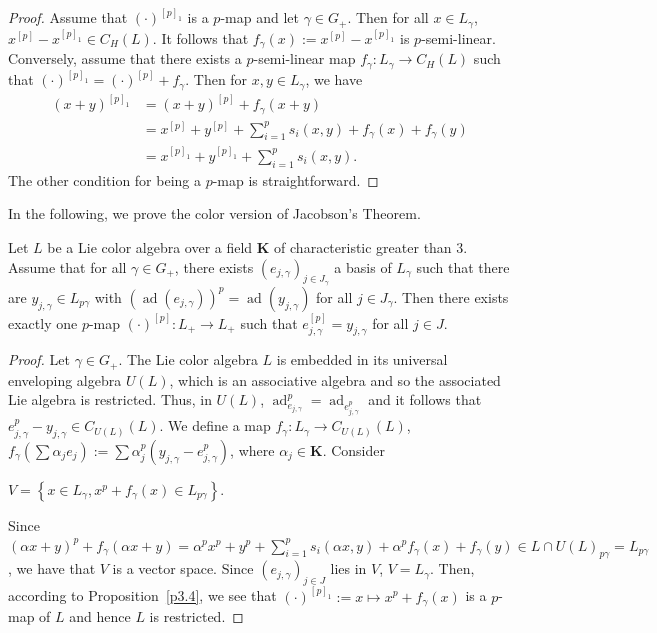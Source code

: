 \documentclass[11pt, twoside]{article}
\DeclareMathOperator{\ad}{ad}
\begin{document}
\begin{proof}
     Assume that $(\cdot)^{[p]_1} $ is a $p$-map and  let $\gamma\in G_+$. Then for all $x\in L_\gamma$, $x^{[p]}-x^{[p]_1}\in C_H(L) $. It follows that $f_\gamma(x):= x^{[p]}-x^{[p]_1} $ is $p$-semi-linear. Conversely, assume that there exists a $p$-semi-linear map $f_\gamma: L_\gamma\to C_H(L)$ such that $(\cdot)^{[p]_1}= (\cdot)^{[p]}+ f_\gamma $. Then for $x,y\in L_\gamma $, we have \begin{align*}
        (x+y)^{[p]_1} &= (x+y)^{[p]}+ f_\gamma(x+y) \\ &= x^{[p]}+y^{[p]} + \sum\limits_{i=1}^p s_i(x,y) + f_\gamma(x) +f_\gamma(y) \\ & = x^{[p]_1}+y^{[p]_1} + \sum\limits_{i=1}^ps_i(x,y). 
    \end{align*} The other condition for being a $p$-map is straightforward. 
\end{proof}
In the following, we prove the color version of Jacobson's Theorem.
\begin{thm}\label{thm3.5}
    Let $L$ be a Lie color algebra over a field $\mathbf{K} $ of characteristic greater than $3$. Assume that for all $\gamma\in G_+ $, there exists $(e_{j,\gamma})_{j\in J_\gamma} $ a basis of $L_\gamma$ such that there are $y_{j,\gamma}\in L_{p\gamma} $ with $(\ad (e_{j,\gamma}))^p= \ad (y_{j,\gamma})$ for all $j\in J_\gamma $. Then there exists exactly one $p$-map $(\cdot)^{[p]}:L_+\to L_+ $ such that $e_{j,\gamma}^{[p]}=y_{j,\gamma} $ for all $j\in J$. 
\end{thm}

\begin{proof}
    Let $\gamma\in G_+ $. The Lie color algebra $L$ is embedded in its universal enveloping algebra $U(L)$, which is an associative algebra and so the associated Lie algebra  is restricted. Thus, in $U(L)$, $\ad_{e_{j,\gamma}}^p= \ad_{e_{j,\gamma}^p} $ and it follows that $e_{j,\gamma}^p-y_{j,\gamma}\in C_{U(L)}(L) $. We define a map $f_\gamma: L_\gamma\to C_{U(L)}(L) $, $f_\gamma(\sum\alpha_je_j):= \sum\alpha_j^p(y_{j,\gamma}-e_{j,\gamma}^p)$, where $\alpha_j\in \mathbf{K} $. Consider \begin{center}
        $ V = \left\{x\in L_\gamma , x^p+f_\gamma(x) \in L_{p\gamma}\right\} $.
    \end{center} Since $(\alpha x+y)^p+f_\gamma(\alpha x+y) = \alpha^px^p+y^p+\sum\limits_{i=1}^ps_i(\alpha x,y) + \alpha^pf_\gamma(x)+ f_\gamma(y) \in L\cap U(L)_{p\gamma}= L_{p\gamma} $, we have that $V$ is a vector space. Since $(e_{j,\gamma})_{j\in J}$ lies in $V$, $V=L_\gamma$. Then, according to Proposition~\ref{p3.4},
    we see that $ (\cdot)^{[p]_1}:= x\mapsto x^p+f_\gamma(x) $ is a $p$-map of $L$ and hence $L$ is restricted.
\end{proof}
\end{document}
